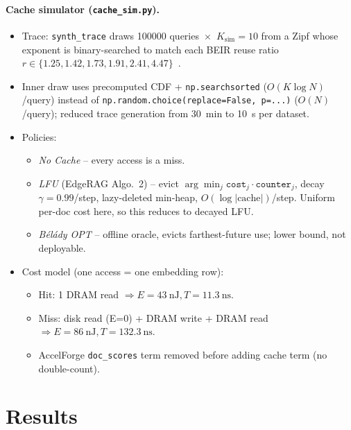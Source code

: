 \documentclass[11pt]{article}
\begin{document}
\paragraph{Cache simulator (\texttt{cache\_sim.py}).}
\begin{itemize}
  \item Trace: \texttt{synth\_trace} draws \num{100000} queries~$\times$~$K_{\text{sim}}{=}10$ from a Zipf whose exponent is binary-searched to match each BEIR reuse ratio $r\in\{\num{1.25},\num{1.42},\num{1.73},\num{1.91},\num{2.41},\num{4.47}\}$~\cite{beir}.
  \item Inner draw uses precomputed CDF + \texttt{np.searchsorted} (\(O(K\log N)\)/query) instead of \texttt{np.random.choice(replace=False, p=...)} (\(O(N)\)/query); reduced trace generation from \SI{30}{\minute} to \SI{10}{\second} per dataset.
  \item Policies:
    \begin{itemize}
      \item \emph{No Cache} -- every access is a miss.
      \item \emph{LFU} (EdgeRAG Algo.~2) -- evict $\arg\min_j \texttt{cost}_j\!\cdot\!\texttt{counter}_j$, decay $\gamma{=}0.99$/step, lazy-deleted min-heap, $O(\log|\text{cache}|)$/step. Uniform per-doc cost here, so this reduces to decayed LFU.
      \item \emph{B\'el\'ady OPT} -- offline oracle, evicts farthest-future use; lower bound, not deployable.
    \end{itemize}
  \item Cost model (one access = one embedding row):
    \begin{itemize}
      \item Hit: 1 DRAM read $\Rightarrow E{=}\SI{43}{\nano\joule}, T{=}\SI{11.3}{\nano\second}$.
      \item Miss: disk read (E=0) + DRAM write + DRAM read $\Rightarrow E{=}\SI{86}{\nano\joule}, T{=}\SI{132.3}{\nano\second}$.
      \item AccelForge \texttt{doc\_scores} term removed before adding cache term (no double-count).
    \end{itemize}
\end{itemize}

\section{Results}
\end{document}
